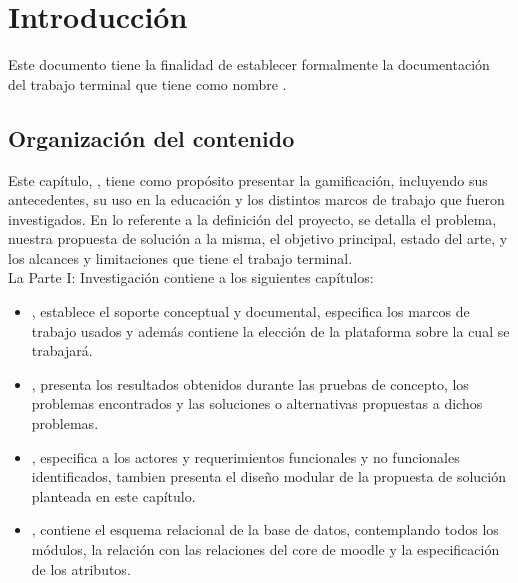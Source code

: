 \chapter{Introducción}
\label{ch:introduccion}

Este documento tiene la finalidad de establecer formalmente la documentación del trabajo terminal {\numeroTT} que tiene como nombre {\bf\tituloTT}.

\section{Organización del contenido}

Este capítulo, , tiene como propósito presentar la gamificación, incluyendo sus antecedentes, su uso en la educación y los distintos marcos de trabajo que fueron investigados. En lo referente a la definición del proyecto, se detalla el problema, nuestra propuesta de solución a la misma, el objetivo principal, estado del arte, y los alcances y limitaciones que tiene el trabajo terminal.\\

\noindent La {\pf Parte I: Investigación} contiene a los siguientes capítulos:%

    \begin{itemize}
        \item {}, establece el soporte conceptual y documental, 
        especifica los marcos de trabajo usados y además contiene la elección de la 
        plataforma sobre la cual se trabajará.
        
        \item {}, presenta los resultados obtenidos durante 
        las pruebas de concepto, los problemas encontrados y las soluciones o alternativas 
        propuestas a dichos problemas.
    
        \item {}, especifica a los actores y requerimientos funcionales
        y no funcionales identificados, tambien presenta el diseño modular de la propuesta
        de solución planteada en este capítulo.
        
        \item {}, contiene el esquema relacional de la base de 
        datos, contemplando todos los módulos, la relación con las relaciones del core de 
        moodle y la especificación de los atributos.
    \end{itemize}

